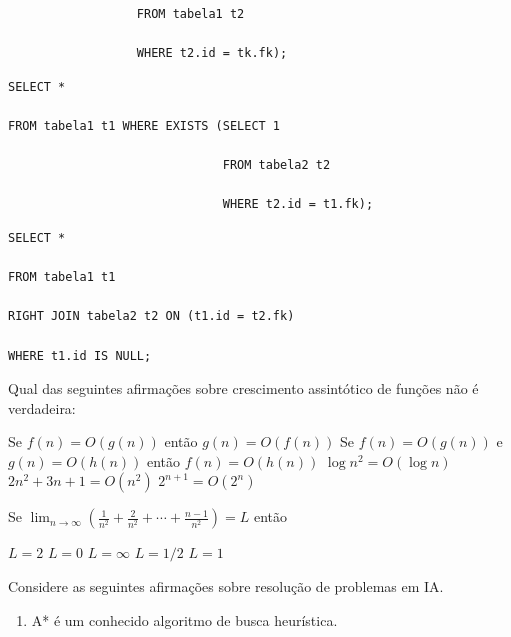 \documentclass[12pt, addpoints]{exam}
\begin{document}
\begin{questions}
\begin{choices}
\begin{verbatim}
                  FROM tabela1 t2

                  WHERE t2.id = tk.fk);

\end{verbatim}


\choice \begin{verbatim}SELECT *

FROM tabela1 t1 WHERE EXISTS (SELECT 1

                              FROM tabela2 t2

                              WHERE t2.id = t1.fk);

\end{verbatim}


\choice \begin{verbatim}SELECT *

FROM tabela1 t1

RIGHT JOIN tabela2 t2 ON (t1.id = t2.fk)

WHERE t1.id IS NULL;

\end{verbatim}


\end{choices}

\question

Qual das seguintes afirmações sobre crescimento assintótico de funções não é verdadeira:
\begin{choices}
\choice Se \( f(n) = O(g(n)) \) então \( g(n) = O(f(n)) \)
\choice Se \( f(n) = O(g(n)) \) e \( g(n) = O(h(n)) \) então \( f(n) = O(h(n)) \)
\choice \( \log n^2 = O(\log n) \)
\choice \( 2n^2 + 3n + 1 = O(n^2) \)
\choice \( 2^{n+1} = O(2^n) \)
\end{choices}

\question

Se \( \lim_{n \to \infty} \left( \frac{1}{n^2} + \frac{2}{n^2} + \cdots + \frac{n-1}{n^2} \right) = L \) então


\begin{choices}
\choice \( L = 2 \)
\choice \( L = 0 \)
\choice \( L = \infty \)
\choice \( L = 1/2 \)
\choice \( L = 1 \)
\end{choices}

\question

Considere as seguintes afirmações sobre resolução de problemas em IA.

\begin{enumerate}[label=\Roman*.]

    \item A* é um conhecido algoritmo de busca heurística.


\end{enumerate}
\end{questions}
\end{document}
